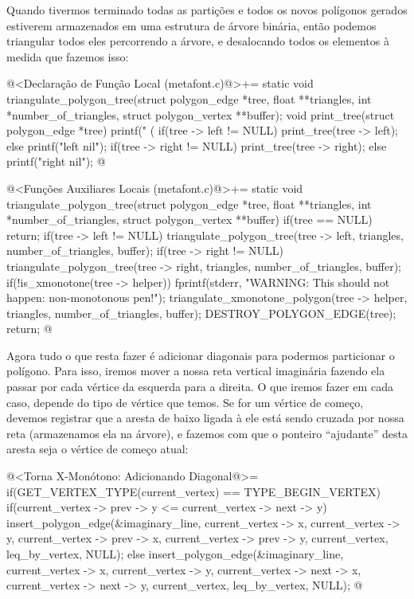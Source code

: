 {{{{{{Quando tivermos terminado todas as partições e todos os novos
polígonos gerados estiverem armazenados em uma estrutura de árvore
binária, então podemos triangular todos eles percorrendo a árvore, e
desalocando todos os elementos à medida que fazemos isso:

\iniciocodigo
@<Declaração de Função Local (metafont.c)@>+=
static void triangulate_polygon_tree(struct polygon_edge *tree,
                                     float **triangles,
                                     int *number_of_triangles,
                                     struct polygon_vertex **buffer);
void print_tree(struct polygon_edge *tree){
  printf(" (%
  if(tree -> left != NULL)
    print_tree(tree -> left);
  else printf("left nil\n");
  if(tree -> right != NULL)
    print_tree(tree -> right);
  else printf("right nil\n");
}
@
\fimcodigo

\iniciocodigo
@<Funções Auxiliares Locais (metafont.c)@>+=
static void triangulate_polygon_tree(struct polygon_edge *tree,
                                     float **triangles,
                                     int *number_of_triangles,
                                     struct polygon_vertex **buffer){
  if(tree == NULL)
    return;
  if(tree -> left != NULL)
    triangulate_polygon_tree(tree -> left, triangles, number_of_triangles,
                             buffer);
  if(tree -> right != NULL)
    triangulate_polygon_tree(tree -> right, triangles, number_of_triangles,
                             buffer);
  if(!is_xmonotone(tree -> helper))
    fprintf(stderr, "WARNING: This should not happen: non-monotonous pen!\n");
  triangulate_xmonotone_polygon(tree -> helper, triangles,
                                number_of_triangles, buffer);
  DESTROY_POLYGON_EDGE(tree);
  return;
}
@
\fimcodigo

Agora tudo o que resta fazer é adicionar diagonais para podermos
particionar o polígono. Para isso, iremos mover a nossa reta vertical
imaginária fazendo ela passar por cada vértice da esquerda para a
direita. O que iremos fazer em cada caso, depende do tipo de vértice
que temos. Se for um vértice de começo, devemos registrar que a aresta
de baixo ligada à ele está sendo cruzada por nossa reta (armazenamos
ela na árvore), e fazemos com que o ponteiro ``ajudante'' desta aresta
seja o vértice de começo atual:


\iniciocodigo
@<Torna X-Monótono: Adicionando Diagonal@>=
if(GET_VERTEX_TYPE(current_vertex) == TYPE_BEGIN_VERTEX){
  if(current_vertex -> prev -> y <= current_vertex -> next -> y){
    insert_polygon_edge(&imaginary_line, current_vertex -> x,
                        current_vertex -> y, current_vertex -> prev -> x,
                        current_vertex -> prev -> y,
                        current_vertex, leq_by_vertex, NULL);
  }
  else{
    insert_polygon_edge(&imaginary_line, current_vertex -> x,
                        current_vertex -> y, current_vertex -> next -> x,
                        current_vertex -> next -> y,
                        current_vertex, leq_by_vertex, NULL);
  }
}
@
\fimcodigo

}}}}}}
